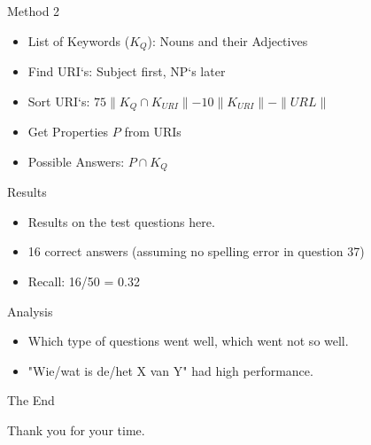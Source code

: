   \begin{frame}{Method 2}
    \begin{itemize}
      \item List of Keywords ($K_Q$): Nouns and their Adjectives 
      \item Find URI`s: Subject first, NP`s later
      \item Sort URI`s: $75\parallel K_Q \cap K_{URI} \parallel - 10\parallel K_{URI}\parallel - \parallel URL \parallel$
      \item Get Properties $P$ from URIs
      \item Possible Answers: $P \cap K_Q$
    \end{itemize}
  \end{frame}
  
  \begin{frame}{Results}
    \begin{itemize}
      \item Results on the test questions here.
      \item 16 correct answers (assuming no spelling error in question 37)
      \item Recall: 16/50 = 0.32
    \end{itemize}
  \end{frame}
  
  \begin{frame}{Analysis}
    \begin{itemize}
      \item Which type of questions went well, which went not so well.
      \item "Wie/wat is de/het X van Y" had high performance.
    \end{itemize}
  \end{frame}

  \begin{frame}{The End}
    \begin{center}
      Thank you for your time.
    \end{center}
  \end{frame}

